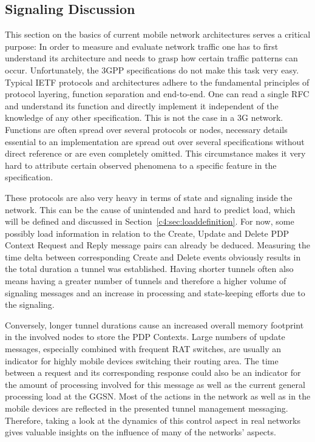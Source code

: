 \subsection{Signaling Discussion}

This section on the basics of current mobile network architectures serves a critical purpose: In order to measure and evaluate network traffic one has to first understand its architecture and needs to grasp how certain traffic patterns can occur. Unfortunately, the \gls{3GPP} specifications do not make this task very easy. Typical \gls{IETF} protocols and architectures adhere to the fundamental principles of protocol layering, function separation and end-to-end. One can read a single \gls{RFC} and understand its function and directly implement it independent of the knowledge of any other specification. This is not the case in a \gls{3G} network. Functions are often spread over several protocols or nodes, necessary details essential to an implementation are spread out over several specifications without direct reference or are even completely omitted. This circumstance makes it very hard to attribute certain observed phenomena to a specific feature in the specification.

These protocols are also very heavy in terms of state and signaling inside the network. This can be the cause of unintended and hard to predict load, which will be defined and discussed in Section~\ref{c4:sec:loaddefinition}. For now, some possibly load information in relation to the Create, Update and Delete \gls{PDP} Context Request and Reply message pairs can already be deduced. Measuring the time delta between corresponding Create and Delete events obviously results in the total duration a tunnel was established. Having shorter tunnels often also means having a greater number of tunnels and therefore a higher volume of signaling messages and an increase in processing and state-keeping efforts due to the signaling. 

Conversely, longer tunnel durations cause an increased overall memory footprint in the involved nodes to store the \gls{PDP} Contexts. Large numbers of update messages, especially combined with frequent \gls{RAT} switches, are usually an indicator for highly mobile devices switching their routing area. The time between a request and its corresponding response could also be an indicator for the amount of processing involved for this message as well as the current general processing load at the \gls{GGSN}. Most of the actions in the network as well as in the mobile devices are reflected in the presented tunnel management messaging. Therefore, taking a look at the dynamics of this control aspect in real networks gives valuable insights on the influence of many of the networks' aspects.





